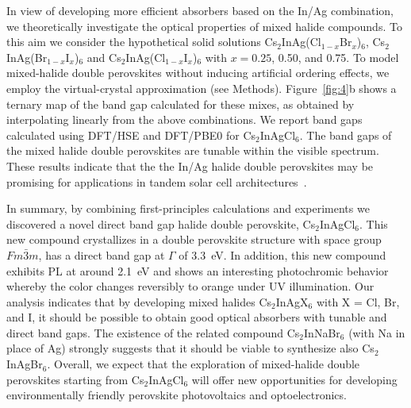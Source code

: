 \documentclass[journal=jpcl,manuscript=letter,layout=traditional]{achemso}
\begin{document}
In view of developing more efficient absorbers based on the In/Ag combination, we theoretically
investigate the optical properties of mixed halide compounds. To this aim we consider the hypothetical solid solutions
Cs$_2$InAg(Cl$_{1-x}$Br$_{x}$)$_6$, Cs$_2$InAg(Br$_{1-x}$I$_{x}$)$_6$ and Cs$_2$InAg(Cl$_{1-x}$I$_{x}$)$_6$
with $x= 0.25$, 0.50, and 0.75. To model mixed-halide double perovskites without inducing
artificial ordering effects, we employ the virtual-crystal approximation (see Methods).
Figure~\ref{fig:4}b shows a ternary map of the band gap calculated for these mixes, as obtained
by interpolating linearly from the above combinations. We report band gaps calculated using
DFT/HSE  and DFT/PBE0  for Cs$_2$InAgCl$_6$. The band gaps of the mixed halide double perovskites
are  tunable within the visible spectrum. These results indicate
that the the In/Ag halide double perovskites may be promising for applications in tandem solar cell
architectures~\cite{Eperon2016}.

In summary, by combining first-principles calculations and experiments we discovered a novel
direct band gap halide double perovskite, Cs$_2$InAgCl$_6$. This new compound crystallizes in
a double perovskite structure with space group $Fm\bar{3}m$, has a direct band gap at $\Gamma$
of 3.3~eV. In addition, this new compound exhibits PL at around 2.1~eV and
shows an interesting photochromic behavior whereby the color changes reversibly to orange under
UV illumination. Our analysis indicates
that by developing mixed halides Cs$_2$InAgX$_6$ with X = Cl, Br, and I, it should be possible
to obtain good optical absorbers with tunable and direct band gaps.
The existence of the related compound Cs$_2$InNaBr$_6$ (with Na in place of Ag) strongly suggests
that it should be viable to synthesize also Cs$_2$InAgBr$_6$. Overall, we expect that the exploration
of mixed-halide double perovskites starting from Cs$_2$InAgCl$_6$ will offer new opportunities for
developing environmentally friendly perovskite photovoltaics and optoelectronics.
\end{document}
